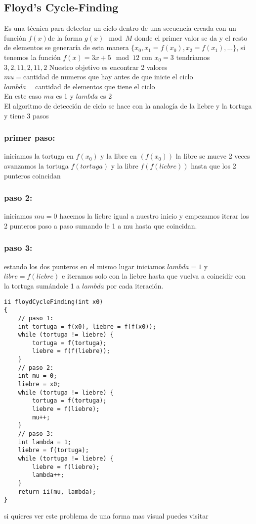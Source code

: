 \subsection{Floyd’s Cycle-Finding}
Es una técnica para detectar un ciclo dentro de una secuencia creada con un función $f(x)$de la forma $g(x) \mod{M}$
donde el primer valor se da y el resto de elementos  se generaría de esta manera $\{x_{0}, x_{1}=f(x_{0}), x_{2}=f(x_{1}),  …\}$,
si tenemos la función $f(x)=3x+5 \mod{12}$ con $x_{0}=3$ tendríamos ${3, 2,11,2,11,2}$ Nuestro objetivo es encontrar 2 valores
\\$mu = $cantidad de numeros que hay antes de que inicie el ciclo
\\$lambda = $cantidad de elementos que tiene el ciclo
\\En este caso $mu$ es 1 y $lambda$ es 2
\\El algoritmo de detección de ciclo se hace con la analogía de la liebre y la tortuga y tiene 3 pasos
\subsubsection{primer paso:}
iniciamos la  tortuga en $f(x_{0})$ y la libre en $(f(x_{0}))$ la libre se mueve 2 veces avanzamos la tortuga $f(tortuga)$ y la libre $f(f(liebre))$ hasta que los 2 punteros coincidan
\subsubsection{paso 2:}
iniciamos $mu=0$ hacemos la liebre igual a nuestro inicio y empezamos iterar los 2 punteros paso a paso sumando le 1 a mu hasta que coincidan.
\subsubsection{paso 3:}
estando los dos punteros en el mismo lugar iniciamos $lambda=1$ y $libre=f(liebre)$
e iteramos solo con la liebre hasta que vuelva a coincidir con la tortuga sumándole 1 a $lambda$ por cada iteración.
\begin{minipage}{\textwidth}
\begin{lstlisting}[style=C,caption=floydCycleFinding.cpp]
ii floydCycleFinding(int x0)
{
    // paso 1:
    int tortuga = f(x0), liebre = f(f(x0));
    while (tortuga != liebre) {
        tortuga = f(tortuga);
        liebre = f(f(liebre));
    }
    // paso 2:
    int mu = 0;
    liebre = x0;
    while (tortuga != liebre) {
        tortuga = f(tortuga);
        liebre = f(liebre);
        mu++;
    }
    // paso 3:
    int lambda = 1;
    liebre = f(tortuga);
    while (tortuga != liebre) {
        liebre = f(liebre);
        lambda++;
    }
    return ii(mu, lambda);
}
\end{lstlisting}
\end{minipage}


si quieres ver este problema de una forma mas visual puedes visitar \cite{Visualgo:Online}
